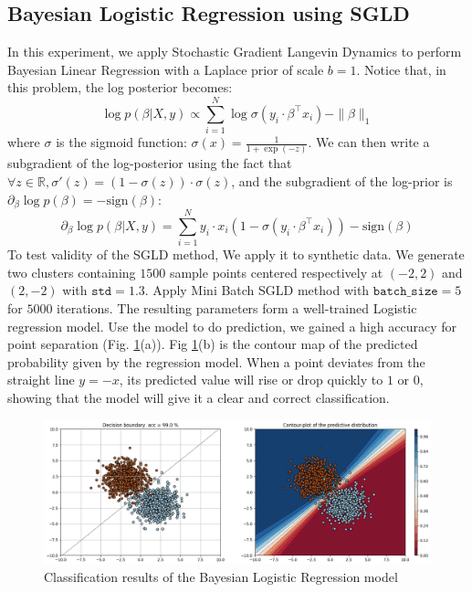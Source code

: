 \documentclass[10pt]{amsart}
\begin{document}
\subsection{Bayesian Logistic Regression using SGLD}
In this experiment, we apply Stochastic Gradient Langevin Dynamics to perform Bayesian Linear Regression with a Laplace prior of scale \( b=1 \). Notice that, in this problem, the log posterior becomes:
$$
\log p(\beta | X, y) \propto \sum_{i=1}^N \log \sigma(y_i \cdot \beta^{\top}x_i) - \|\beta\|_1
$$
where $\sigma$ is the sigmoid function: $\sigma(x)=\frac{1}{1+\exp(-z)}$. We can then write a subgradient of the log-posterior using the fact that $\forall z \in \mathbb{R}, \sigma'(z) = (1 - \sigma(z)) \cdot \sigma(z)$, and the subgradient of the log-prior is $\partial_{\beta} \log p(\beta) = - \text{sign}(\beta)$:
$$
\partial_{\beta} \log p(\beta | X, y) = \sum_{i=1}^N y_i \cdot x_i \left( 1 - \sigma(y_i \cdot \beta^{\top}x_i) \right) - \text{sign}(\beta)
$$
To test validity of the SGLD method, We apply it to synthetic data. We generate two clusters containing $1500$ sample points centered respectively at $(-2,2)$ and $(2,-2)$ with $\texttt{std}=1.3$. Apply Mini Batch SGLD method with $\texttt{batch\_size}=5$ for $5000$ iterations. The resulting parameters form a well-trained Logistic regression model. Use the model to do prediction, we gained a high accuracy for point separation (Fig. \ref{fig:logr}(a)). Fig \ref{fig:logr}(b) is the contour map of the predicted probability given by the regression model. When a point deviates from the straight line $y=-x$, its predicted value will rise or drop quickly to $1$ or $0$, showing that the model will give it a clear and correct classification.
\begin{figure}[ht]
    \centering
    \includegraphics[width=1\linewidth]{graph/SGLD_LogR.png}
    \caption{Classification results of the Bayesian Logistic Regression model}
    \label{fig:logr}
\end{figure}
\end{document}
